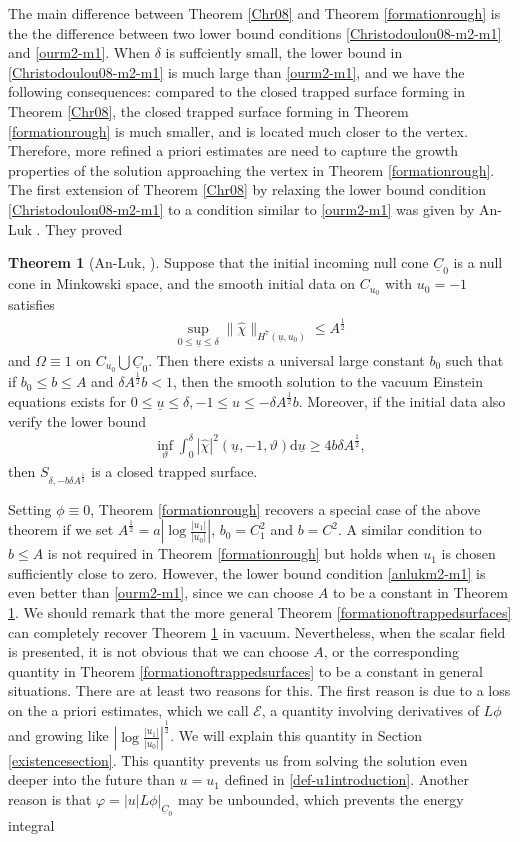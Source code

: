 \documentclass[11pt,reqno]{amsart}
\theoremstyle{definition}
\newtheorem{theorem}{Theorem}[section]
\numberwithin{equation}{section}
\newcommand{\D}{\mathrm{d}}
\def\chih{\widehat{\chi}}
\def\ub{\underline{u}}
\def\Cb{\underline{C}}
\begin{document}
The main difference between Theorem \ref{Chr08} and Theorem \ref{formationrough} is the the difference between two lower bound conditions \eqref{Christodoulou08-m2-m1} and \eqref{ourm2-m1}. When $\delta$ is suffciently small, the lower bound in \eqref{Christodoulou08-m2-m1} is much large than \eqref{ourm2-m1}, and we have the following consequences: compared to the closed trapped surface forming in Theorem \ref{Chr08},  the closed trapped surface forming in Theorem \ref{formationrough}  is much smaller, and is located much closer to the vertex. Therefore, more refined a priori estimates are need to capture the growth properties of the solution approaching the vertex in Theorem \ref{formationrough}. The first extension of  Theorem \ref{Chr08} by relaxing the lower bound condition \eqref{Christodoulou08-m2-m1} to a condition similar to  \eqref{ourm2-m1} was given by An-Luk \cite{An-Luk}. They proved
\begin{theorem}[An-Luk, \cite{An-Luk}]\label{An-Luk}
Suppose that the initial incoming null cone $\Cb_0$ is a null cone in Minkowski space, and the smooth initial data on $C_{u_0}$ with $u_0=-1$ satisfies
\begin{align*}
\sup_{0\le\ub\le\delta}\|\chih\|_{H^7(\ub,u_0)}\le A^{\frac{1}{2}}
\end{align*}
and $\Omega\equiv1$ on $C_{u_0}\bigcup\Cb_0$. Then there exists a universal large constant $b_0$ such that if $b_0\le b\le A$ and $\delta A^{\frac{1}{2}}b<1$, then the smooth solution to the vacuum Einstein equations exists for $0\le\ub\le\delta, -1\le u\le-\delta A^{\frac{1}{2}}b$. Moreover, if the initial data also verify the lower bound 
\begin{align}\label{anlukm2-m1}
\inf_{\vartheta}\int_0^\delta|\chih|^2(\ub,-1,\vartheta)\D\ub\ge 4b\delta A^{\frac{1}{2}},
\end{align}
then $S_{\delta, -b\delta A^{\frac{1}{2}}}$ is a closed trapped surface.
 \end{theorem}
Setting $\phi\equiv0$, Theorem \ref{formationrough} recovers a special case of the above theorem if we set $A^{\frac{1}{2}}=a\left|\log\frac{|u_1|}{|u_0|}\right|$, $b_0=C_1^2$ and $b=C^2$. A similar condition to $b\le A$ is not required in Theorem \ref{formationrough} but holds when $u_1$ is chosen sufficiently close to zero. However, the lower bound condition \eqref{anlukm2-m1} is even better than \eqref{ourm2-m1}, since we can choose $A$ to be a constant in Theorem \ref{An-Luk}. We should remark that the more general Theorem \ref{formationoftrappedsurfaces} can completely recover Theorem \ref{An-Luk} in vacuum. Nevertheless, when the scalar field is presented, it is not obvious that we can choose $A$, or the corresponding quantity in Theorem \ref{formationoftrappedsurfaces} to be a constant in general situations. There are at least two reasons for this. The first reason is due to a loss on the a priori estimates, which we call $\mathscr{E}$, a quantity involving derivatives of $L\phi$ and growing like $\left|\log\frac{|u_1|}{|u_0|}\right|^{\frac{1}{2}}$. We will explain this quantity in Section \ref{existencesection}. This quantity prevents us from solving the solution even deeper into the future than $u=u_1$ defined in \eqref{def-u1introduction}. Another reason is that $\varphi=|u|L\phi|_{\Cb_0}$ may be unbounded, which prevents  the energy integral
\end{document}
